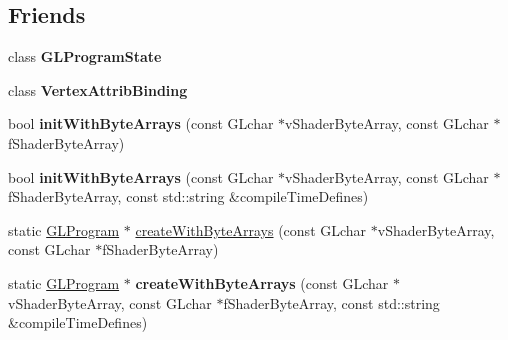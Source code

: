 \subsection*{Friends}
\begin{DoxyCompactItemize}
\item 
\mbox{\label{classGLProgram_ae18eab2cdc34c4231ddade1d262fab25}} 
class {\bfseries G\+L\+Program\+State}
\item 
\mbox{\label{classGLProgram_af0e093b7754b8ed07c6283d3f7083bca}} 
class {\bfseries Vertex\+Attrib\+Binding}
\end{DoxyCompactItemize}
\begin{DoxyCompactItemize}
\item 
\mbox{\label{classGLProgram_a8aa8255b8b44db4116d0feff3147da00}} 
bool {\bfseries init\+With\+Byte\+Arrays} (const G\+Lchar $\ast$v\+Shader\+Byte\+Array, const G\+Lchar $\ast$f\+Shader\+Byte\+Array)
\item 
\mbox{\label{classGLProgram_a65e771537335d8c70e17f183d99dbf01}} 
bool {\bfseries init\+With\+Byte\+Arrays} (const G\+Lchar $\ast$v\+Shader\+Byte\+Array, const G\+Lchar $\ast$f\+Shader\+Byte\+Array, const std\+::string \&compile\+Time\+Defines)
\item 
static \hyperlink{classGLProgram}{G\+L\+Program} $\ast$ \hyperlink{classGLProgram_ab0ef9116f8efe7aa0d6d1a689dbfb262}{create\+With\+Byte\+Arrays} (const G\+Lchar $\ast$v\+Shader\+Byte\+Array, const G\+Lchar $\ast$f\+Shader\+Byte\+Array)
\item 
\mbox{\label{classGLProgram_af7e553703ac6f74811c0b191dfe0a5c8}} 
static \hyperlink{classGLProgram}{G\+L\+Program} $\ast$ {\bfseries create\+With\+Byte\+Arrays} (const G\+Lchar $\ast$v\+Shader\+Byte\+Array, const G\+Lchar $\ast$f\+Shader\+Byte\+Array, const std\+::string \&compile\+Time\+Defines)
\end{DoxyCompactItemize}

